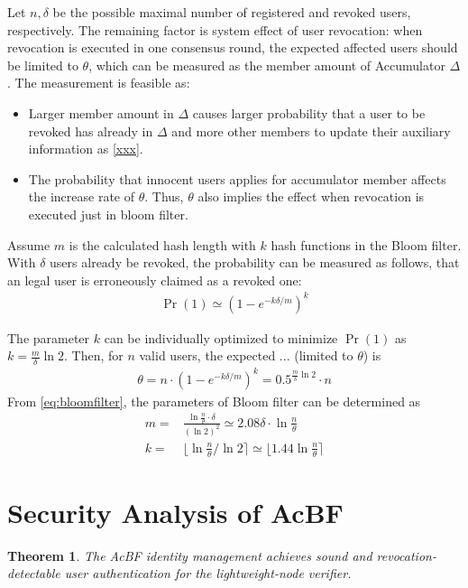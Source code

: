 \documentclass[conference]{IEEEtran}
\newtheorem{theorem}{Theorem}
\begin{document}
Let $n, \delta$ be the possible maximal number of registered and revoked users, respectively. The remaining factor is system effect of user revocation: when revocation is executed in one consensus round, the expected affected users should be limited to $\theta$, which can be measured as the member amount of Accumulator $\Delta$. The measurement is feasible as:
\begin{itemize}
    \item Larger member amount in $\Delta$ causes larger probability that a user to be revoked has already in $\Delta$ and more other members to update their auxiliary information as \eqref{xxx}.
    \item The probability that innocent users applies for accumulator member affects the increase rate of $\theta$. Thus, $\theta$ also implies the effect when revocation is executed just in bloom filter.
\end{itemize}

Assume $m$ is the calculated hash length with $k$ hash functions in the Bloom filter. With $\delta$ users already be revoked, the probability can be measured as follows, that an legal user is erroneously claimed as a revoked one: 
\begin{align} 
    \Pr(1) \simeq (1 - e^{-k\delta/m})^k 
 \end{align}

The parameter $k$ can be individually optimized to minimize $\Pr(1)$ as $ k = \frac{m}{\delta}\ln 2$. Then, for $n$ valid users, the expected ... (limited to $\theta$) is 
\begin{align}\label{eq:bloomfilter}
    \theta = n \cdot (1 - e^{-k\delta/m})^{k} = 0.5^{\frac{m}{\delta}\ln 2}\cdot n
\end{align}
From \eqref{eq:bloomfilter}, the parameters of Bloom filter can be determined as 
\begin{align}
m = & \frac{\ln \frac{n}{\theta} \cdot \delta}{(\ln 2)^2} \simeq 2.08\delta \cdot\ln \frac{n}{\theta}\\
k = & \lfloor \ln \frac{n}{\theta} / \ln 2 \rceil \simeq \lfloor 1.44 \ln \frac{n}{\theta} \rceil
\end{align}

\section{Security Analysis of AcBF}
\begin{theorem}\label{theo:security}
	The AcBF identity management achieves sound and revocation-detectable user authentication for the lightweight-node verifier.
\end{theorem}
\end{document}
